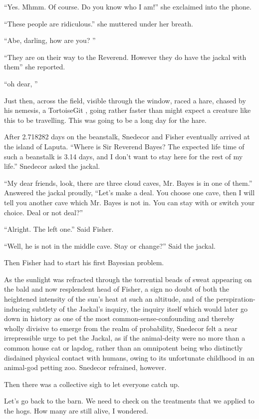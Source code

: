 \documentclass{article}
\begin{document}
``Yes. Mhmm. Of course. Do you know who I am!'' she exclaimed into the phone. 

``These people are ridiculous.'' she muttered under her breath. 

``Abe, darling, how are you? ''

``They are on their way to the Reverend. However they do have the jackal with them'' she reported.

``oh dear, ''

Just then, across the field, visible through the window, raced a hare, chased by his nemesis, a TortoiseGit , going rather faster than might expect a creature like this to be travelling. This was going to be a long day for the hare.

After 2.718282 days on the beanstalk, Snedecor and Fisher eventually arrived at the island of Laputa. 
``Where is Sir Reverend Bayes? The expected life time of such a beanstalk is 3.14 days, 
and I don't want to stay here for the rest of my life.'' Snedecor asked the jackal.

``My dear friends, look, there are three cloud caves, Mr. Bayes is in one of them.'' Answered the jackal proudly,
``Let's make a deal. You choose one cave, then I will tell you another cave which Mr. Bayes is not in.
You can stay with or switch your choice. Deal or not deal?''

``Alright. The left one.'' Said Fisher.

``Well, he is not in the middle cave. Stay or change?'' Said the jackal.

Then Fisher had to start his first Bayesian problem.

As the sunlight was refracted through the torrential beads of sweat appearing on the bald and now resplendent head of Fisher, a sign no doubt of both the heightened intensity of the sun's heat at such an altitude, and of the perspiration-inducing subtlety of the Jackal's inquiry, the inquiry itself which would later go down in history as one of the most common-sense-confounding and thereby wholly divisive to emerge from the realm of probability, Snedecor felt a near irrepressible urge to pet the Jackal, as if the animal-deity were no more than a common house cat or lapdog, rather than an omnipotent being who distinctly disdained physical contact with humans, owing to its unfortunate childhood in an animal-god petting zoo.  Snedecor refrained, however.

Then there was a collective sigh to let everyone catch up.

Let's go back to the barn.  We need to check on the treatments that we applied to the hogs.  How many are still alive, I wondered.
\end{document}
